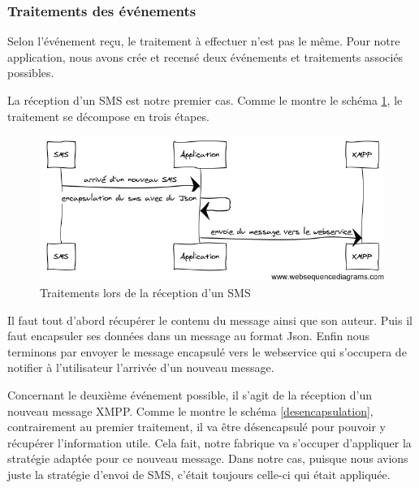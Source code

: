 \subsubsection{Traitements des événements}

Selon l'événement reçu, le traitement à effectuer n'est pas le même. Pour notre application, nous avons 
crée et recensé deux événements et traitements associés possibles.

La réception d'un SMS est notre premier cas. Comme le montre le schéma \ref{encapsulation-sms}, le traitement se 
décompose en trois étapes. 

\begin{figure}[!h]
  \center
  \includegraphics[width=12cm]{img/encapsulation-sms.png}
  \caption{Traitements lors de la réception d'un SMS}
  \label{encapsulation-sms}
\end{figure}

Il faut tout d'abord récupérer le contenu du message ainsi que son auteur. Puis il faut encapsuler 
ses données dans un message au format Json. Enfin nous terminons par envoyer le message encapsulé vers 
le webservice qui s'occupera de notifier à l'utilisateur l'arrivée d'un nouveau message.
 
Concernant le deuxième événement possible, il s'agit de la réception d'un nouveau message XMPP. Comme le
montre le schéma \ref{desencapsulation}, contrairement au premier traitement, il va être désencapsulé pour 
pouvoir y récupérer l'information utile. Cela fait, notre fabrique va s'occuper d'appliquer la stratégie 
adaptée pour ce nouveau message. Dans notre cas, puisque nous avions juste la stratégie d'envoi de SMS, c'était toujours celle-ci qui était appliquée.